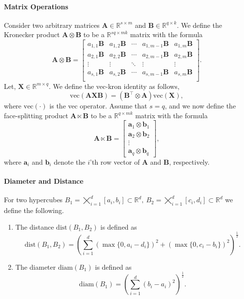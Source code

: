 \documentclass[final,3p,times]{elsarticle}
\renewcommand{\vec}[1]{\boldsymbol{#1}}
\newcommand{\mat}[1]{\boldsymbol{#1}}
\newcommand{\R}{\mathbb{R}}
\begin{document}
\paragraph{Matrix Operations}
Consider two arbitrary matrices $\mat{A} \in \R^{s \times m}$ and $\mat{B} \in \R^{q \times k}$.
We define the Kronecker product $\mat{A} \otimes \mat{B}$
to be a $\R^{sq \times mk}$ matrix with the formula
\begin{equation}\label{form:kron_product}
\mat{A} \otimes \mat{B} = 
\begin{bmatrix}
    a_{1,1}\mat{B} & a_{1,2}\mat{B} & \cdots & a_{1,m-1}\mat{B} & a_{1,m}\mat{B} \\
    a_{2,1}\mat{B} & a_{2,2}\mat{B} & \cdots & a_{2,m-1}\mat{B} & a_{2,m}\mat{B} \\
    \vdots & \vdots & \ddots  & \vdots & \vdots \\
    a_{s,1}\mat{B} & a_{s,2}\mat{B} & \cdots & a_{s,m-1}\mat{B} & a_{s,m}\mat{B} \\
\end{bmatrix}.
\end{equation}
Let, $\mat{X} \in \R^{m \times q}$. We define the vec-kron identity as follows,
\begin{equation}\label{form:veckron}
\text{vec}(\mat{A}\mat{X}\mat{B}) = (\mat{B}^{\top} \otimes \mat{A})\text{vec}(\mat{X}),
\end{equation}
where $\text{vec}(\cdot)$ is the vec operator.
Assume that $ s = q$, and we now define the face-splitting product $\mat{A} \ltimes \mat{B}$ to be a $\R^{q \times mk}$ matrix with the formula
\begin{equation}\label{form:face_split}
\mat{A} \ltimes \mat{B} = \begin{bmatrix}
    \vec{a}_{1} \otimes \vec{b}_{1} \\ 
    \vec{a}_{2} \otimes \vec{b}_{2} \\ 
    \vdots  \\ 
    \vec{a}_{q} \otimes \vec{b}_{q}
\end{bmatrix},
\end{equation}
where $\vec{a}_{i}$ and $\vec{b}_{i}$ denote the $i$'th row vector of $\mat{A}$ and $\mat{B}$, respectively.


\paragraph{Diameter and Distance} 
For two hypercubes $B_1 = \bigtimes_{i=1}^{d}[a_i, b_i] \subset \R^{d} ,~ B_2 = \bigtimes_{i=1}^{d}[c_i, d_i]  \subset \R^{d}$ we define the following.
\begin{enumerate}
    \item The distance $\text{dist}(B_1, B_2)$ is defined as
    $$\text{dist}(B_1, B_2) = \left(\sum_{i=1}^{d}(\max\{0, a_i - d_i \} )^2 + (\max\{0, c_i - b_i \})^2 \right)^{\frac{1}{2}}.$$
    \item The diameter $\text{diam}(B_1)$ is defined as  $$\text{diam}(B_1) = (\sum_{i=1}^{d}(b_i - a_i)^2)^{\frac{1}{2}}.$$
\end{enumerate}
\end{document}
